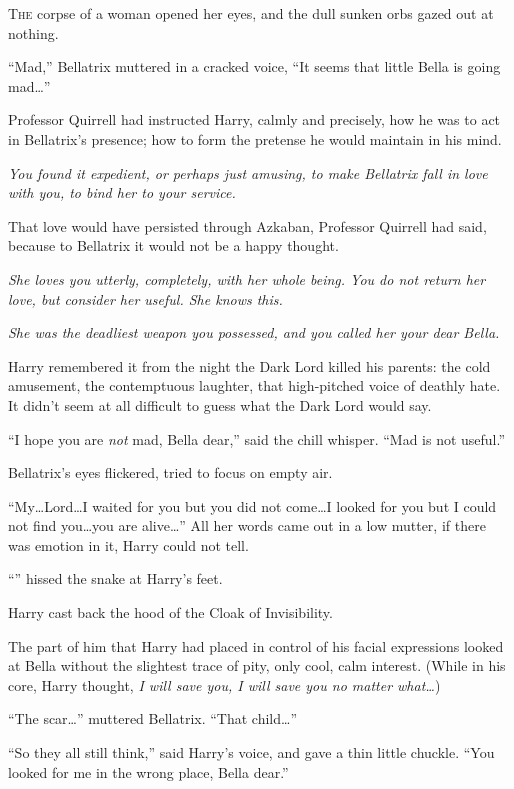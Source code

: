 
\lettrine{T}{he} corpse of a
woman opened her eyes, and the dull sunken orbs gazed out at nothing.

“Mad,” Bellatrix muttered in a cracked voice, “It seems that little Bella is
going mad…”

Professor Quirrell had instructed Harry, calmly and precisely, how he was to
act in Bellatrix’s presence; how to form the pretense he would maintain in his
mind.

\emph{You found it expedient, or perhaps just amusing, to make Bellatrix fall
in love with you, to bind her to your service.}

That love would have persisted through Azkaban, Professor Quirrell had said,
because to Bellatrix it would not be a happy thought.

\emph{She loves you utterly, completely, with her whole being. You do not
return her love, but consider her useful. She knows this.}

\emph{She was the deadliest weapon you possessed, and you called her your dear
Bella.}

Harry remembered it from the night the Dark Lord killed his parents: the cold
amusement, the contemptuous laughter, that high-pitched voice of deathly hate.
It didn’t seem at all difficult to guess what the Dark Lord would say.

“I hope you are \emph{not} mad, Bella dear,” said the chill whisper. “Mad is
not useful.”

Bellatrix’s eyes flickered, tried to focus on empty air.

“My…Lord…I waited for you but you did not come…I looked
for you but I could not find you…you are alive…” All her words
came out in a low mutter, if there was emotion in it, Harry could not tell.

“” hissed the snake at Harry’s feet.

Harry cast back the hood of the Cloak of Invisibility.

The part of him that Harry had placed in control of his facial expressions
looked at Bella without the slightest trace of pity, only cool, calm interest.
(While in his core, Harry thought, \emph{I will save you, I will save you no
matter what…})

“The scar…” muttered Bellatrix. “That child…”

“So they all still think,” said Harry’s voice, and gave a thin little chuckle.
“You looked for me in the wrong place, Bella dear.”

